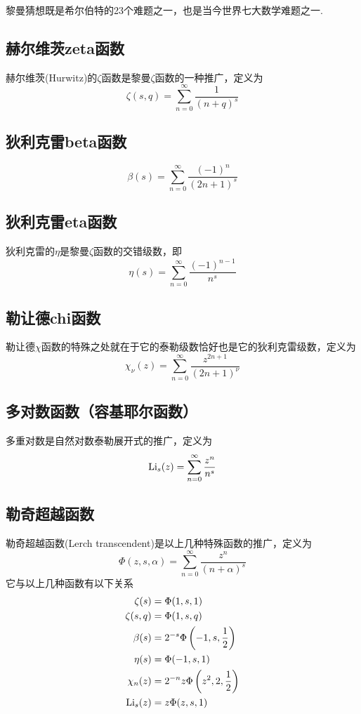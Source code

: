 \documentclass[UTF8]{ctexart}
\newcommand{\trm}[1]{{\rm #1}}
\begin{document}
黎曼猜想既是希尔伯特的23个难题之一，也是当今世界七大数学难题之一.

\subsection{赫尔维茨zeta函数}

赫尔维茨(Hurwitz)的\(\zeta\)函数是黎曼\(\zeta\)函数的一种推广，定义为
\[ \zeta(s,q) = \sum_{n=0}^{\infty}\frac{1}{(n+q)^s} \]

\subsection{狄利克雷beta函数}

\[ \beta(s) = \sum_{n=0}^{\infty} \frac{(-1)^n}{(2n+1)^s}\]

\subsection{狄利克雷eta函数}

狄利克雷的\(\eta\)是黎曼\(\zeta\)函数的交错级数，即
\[ \eta(s) = \sum_{n=0}^{\infty} \frac{(-1)^{n-1}}{n^s}\]

\subsection{勒让德chi函数}

勒让德\(\chi\)函数的特殊之处就在于它的泰勒级数恰好也是它的狄利克雷级数，定义为
\[ \chi_{\nu}(z) = \sum_{n=0}^{\infty}\frac{z^{2n+1}}{(2n+1)^{\nu}} \]

\subsection{多对数函数（容基耶尔函数）}

多重对数是自然对数泰勒展开式的推广，定义为
\[ \trm{Li}_{s}(z) = \sum_{n=0}^{\infty}\frac{z^n}{n^s}\]

\subsection{勒奇超越函数}

勒奇超越函数(Lerch transcendent)是以上几种特殊函数的推广，定义为
\[ \Phi(z,s,\alpha) = \sum_{n=0}^{\infty} \frac{z^n}{(n+\alpha)^s} \]
它与以上几种函数有以下关系
\begin{align*}
    \zeta(s) &= \Phi(1,s,1) \\
    \zeta(s,q) &= \Phi(1,s,q) \\
    \beta(s) &= 2^{-s}\Phi\left(-1,s,\frac{1}{2}\right) \\
    \eta(s) &= \Phi(-1,s,1) \\
    \chi_n(z) &= 2^{-n}z\Phi\left(z^2,2,\frac{1}{2}\right) \\
    \trm{Li}_s(z) &= z\Phi(z,s,1)
\end{align*}
\end{document}
